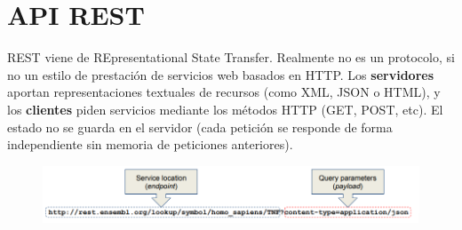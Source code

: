 \section{API REST}
REST viene de REpresentational State Transfer. Realmente no es un protocolo, si no un estilo de prestación de servicios web basados en HTTP. 
Los \textbf{servidores} aportan representaciones textuales de recursos (como XML, JSON o HTML), y los \textbf{clientes} piden servicios mediante los métodos HTTP (GET, POST, etc). 
El estado no se guarda en el servidor (cada petición se responde de forma independiente sin memoria de peticiones anteriores).
\begin{figure}[htbp]
\centering
\includegraphics[width = \textwidth]{figs/rest-request.png}
\end{figure}
